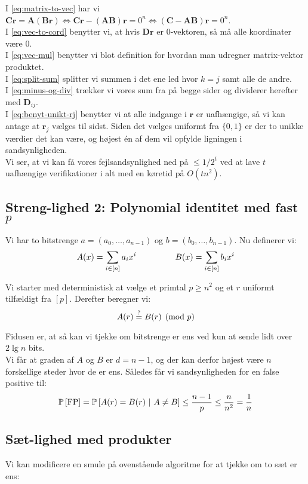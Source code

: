 I \cref{eq:matrix-to-vec} har vi $
\mathbf{Cr} = \mathbf A (\mathbf{Br})
\Longleftrightarrow
\mathbf{Cr} - (\mathbf{AB}) \mathbf{r} = 0^n
\Longleftrightarrow
(\mathbf C - \mathbf{AB}) \mathbf r = 0^n
$.\\
I \cref{eq:vec-to-cord} benytter vi, at hvis $\mathbf{Dr}$ er 0-vektoren, så må alle koordinater være 0.\\
I \cref{eq:vec-mul} benytter vi blot definition for hvordan man udregner matrix-vektor produktet.\\
I \cref{eq:split-sum} splitter vi summen i det ene led hvor $k = j$ samt alle de andre.\\
I \cref{eq:minus-og-div} trækker vi vores sum fra på begge sider og dividerer herefter med $\mathbf D_{ij}$.\\
I \cref{eq:benyt-unikt-rj} benytter vi at alle indgange i $\mathbf r$ er uafhængige, så vi kan antage at $\mathbf r_j$ vælges til sidst. Siden det vælges uniformt fra $\{0, 1\}$ er der to unikke værdier det kan være, og højest én af dem vil opfylde ligningen i sandsynligheden.\\


Vi ser, at vi kan få vores fejlsandsynlighed ned på $\leq 1/2^t$ ved at lave $t$ uafhængige verifikationer i alt med en køretid på $O(t n^2)$.


\subsection{Streng-lighed 2: Polynomial identitet med fast $p$}
Vi har to bitstrenge $a = (a_0, \dots, a_{n-1})$ og $b = (b_0, \dots, b_{n-1})$. Nu definerer vi:
$$
  A(x) = \sum_{i \in [n]} a_i x^i
  {\ \ \ \ \ \ \ \ \ \ \ \ \ \ }
  B(x) = \sum_{i \in [n]} b_i x^i
$$

Vi starter med deterministisk at vælge et primtal $p \geq n^2$ og et $r$ uniformt tilfældigt fra $[p]$. Derefter beregner vi:
$$
  A(r) \stackrel{?}{=} B(r) \pmod p
$$

Fidusen er, at så kan vi tjekke om bitstrenge er ens ved kun at sende lidt over $2 \lg n$ bits.\\

Vi får at graden af $A$ og $B$ er $d = n-1$, og der kan derfor højest være $n$ forskellige steder hvor de er ens. Således får vi sandsynligheden for en false positive til:
$$
  \P{\text{FP}}
  = \P{A(r) = B(r) \ | A \neq B}
  \leq \frac{n-1}{p}
  \leq \frac{n}{n^2}
  = \frac{1}{n}
$$

\subsection{Sæt-lighed med produkter}
Vi kan modificere en smule på ovenstående algoritme for at tjekke om to sæt er ens:

